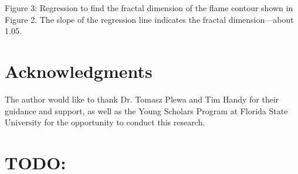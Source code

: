 \documentclass[iop]{emulateapj}
\begin{document}
	Figure 3: Regression to find the fractal dimension of the flame contour shown in Figure 2. The slope of the regression line indicates the fractal dimension—about 1.05.

\section{Acknowledgments}\label{s:ack}
The author would like to thank Dr. Tomasz Plewa and Tim Handy for their guidance and support, as well as the Young Scholars Program at Florida State University for the opportunity to conduct this research.
%
%


%
%
%

\section{TODO:}
\listoftodos
\end{document}
